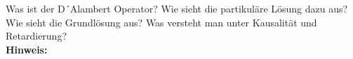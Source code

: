 \begin{question}[section=5,subsection=51,name={Inhomogene Wellengleichung},difficulty=8,type=mdl,tags={}]
	Was ist der D´Alambert Operator? Wie sieht die partikuläre Lösung dazu aus? Wie sieht die Grundlösung aus? Was versteht man unter Kausalität und Retardierung?
	\\ \textbf{Hinweis:}\\
	
\end{question}
\begin{solution}
	
\end{solution}